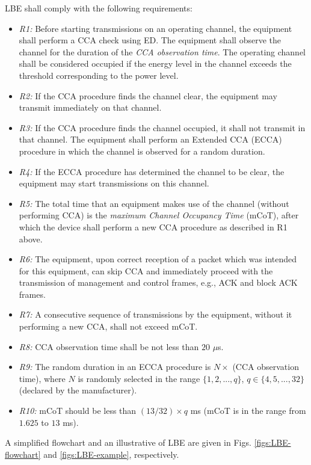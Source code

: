 LBE shall comply with the following requirements:

\begin{itemize}
	
	\item
	\textit{R1:} Before starting transmissions on an operating channel, the equipment shall perform a CCA check using ED. The equipment shall observe the channel for the duration of the \textit{CCA observation time}. The operating channel shall be considered occupied if the energy level in the channel exceeds the threshold corresponding to the power level.
	
	\item
	\textit{R2:}
	If the CCA procedure finds the channel clear, the equipment may transmit immediately on that channel.
	
	\item
	\textit{R3:}
	If the CCA procedure finds the channel occupied, it shall not transmit in that channel. The equipment shall perform an Extended CCA (ECCA) procedure in which the channel is observed for a random duration.
	
	\item
	\textit{R4:}
	If the ECCA procedure has determined the channel to be clear, the equipment may start transmissions on this channel.
	
	\item
	\textit{R5:}
	The total time that an equipment makes use of the channel (without performing CCA) is the \textit{maximum Channel Occupancy Time} (mCoT), after which the device shall perform a new CCA procedure as described in R1 above.
	
	\item
	\textit{R6:}
	The equipment, upon correct reception of a packet which was intended for this equipment, can skip CCA and immediately proceed with the transmission of management and control frames, e.g., ACK and block ACK frames.
	
	\item
	\textit{R7:}
	A consecutive sequence of transmissions by the equipment, without it performing a new CCA, shall not exceed mCoT.
	
	\item
	\textit{R8:}
	CCA observation time shall be not less than $20$ $\mu$s.
	
	\item
	\textit{R9:}
	The random duration in an ECCA procedure is $N \times$ (CCA observation time), where $N$ is randomly selected in the range $\{1,2,...,q\}$, $q \in \{4,5,...,32\}$ (declared by the manufacturer).
	
	\item
	\textit{R10:}
	mCoT should be less than $(13/32)\times q$ ms (mCoT is in the range from $1.625$ to $13$ ms).
	
\end{itemize}

A simplified flowchart and an illustrative of LBE are given in Figs. \ref{figs:LBE-flowchart} and \ref{figs:LBE-example}, respectively.


